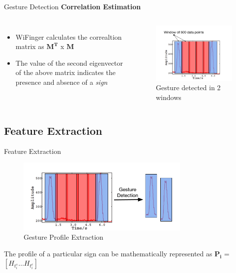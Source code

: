\documentclass{beamer}
\begin{document}
\begin{frame}{Gesture Detection}
\textbf{Correlation Estimation}
	\begin{columns}
			\begin{itemize}
				\item WiFinger calculates the correaltion matrix as $\mathbf{M^{T}}$ x $\mathbf{M}$
				\item The value of the second eigenvector of the above matrix indicates the presence and absence of a \emph{sign}
			\end{itemize}
			\begin{figure}
			\includegraphics[width=1\linewidth]{Images/quals-part-1-gesture-d-2.png}
			\caption{Gesture detected in 2 windows~\cite{li2016wifinger}}
			\end{figure}
	\end{columns}

\end{frame}

\subsection{Feature Extraction}
\begin{frame}{Feature Extraction}
	\begin{center}
		\begin{figure}
			\includegraphics[width=0.75\textwidth]{Images/quals-part-2-gesture-d-3.png}
			\caption{Gesture Profile Extraction~\cite{li2016wifinger}}
		\end{figure}
    \end{center}
The profile of a particular sign can be mathematically represented as $\mathbf{P_i}$ = $[H_{t_{i}^{s}} \ldots H_{t_{i}^{e}}]$
\end{frame}
\end{document}
